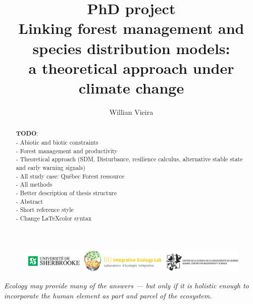 


\title{
  PhD project \\
  \bigskip
  Linking forest management and species distribution models: \\
  a theoretical approach under climate change
}

\author[1,*]{Willian Vieira}
\date{}



\maketitle

\begin{abstract}

\textbf{TODO}: \\
- Abiotic and biotic constraints \\
- Forest management and productivity \\
- Theoretical approach (SDM, Disturbance, resilience calculus, alternative stable state and early warning signals) \\
- All study case: Québec Forest ressource \\
- All methods \\
- Better description of thesis structure \\
- Abstract \\
- Short reference style \\
- Change \LaTeX color syntax

\end{abstract}

\vfill
\begin{figure}
\centering\includegraphics[width=16cm]{img/logo.pdf}
\end{figure}
\thispagestyle{empty} %
\clearpage

\thispagestyle{empty}
\tableofcontents
\clearpage


\begin{displayquote}
\centering\textit{Ecology may provide many of the answers — but only if it is holistic enough to incorporate the human element as part and parcel of the ecosystem.} \\ 
\end{displayquote}

